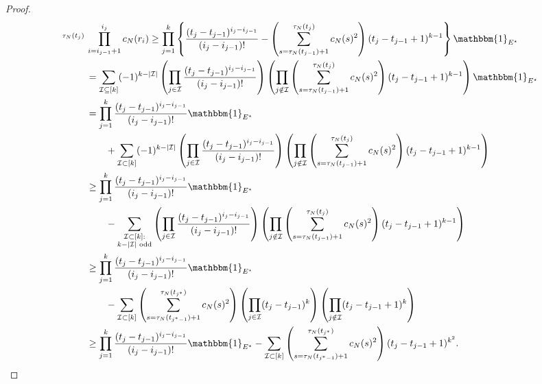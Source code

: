 \documentclass{article}
\newcommand{\1}[1]{\mathbbm{1}_{#1}}
\begin{document}
\begin{proof}
\begin{align}
        ^{\tau_N(t_j)}  \,&\prod_{i=i_{j-1}+1}^{i_j} c_N(r_i)
\geq \prod_{j=1}^k \left\{ \frac{(t_j - t_{j-1})^{i_j - i_{j-1}}}{(i_j - i_{j-1})!}  
        - \left( \sum_{s=\tau_N(t_{j-1})+1}^{\tau_N(t_j)} c_N(s)^2 \right)
        ( t_j - t_{j-1} +1 )^{k-1} \right\} \1{E^\star} \notag\\
&= \sum_{\mathcal{I} \subseteq [k]} (-1)^{k-|\mathcal{I}|} 
        \left( \prod_{j\in\mathcal{I}} \frac{(t_j - t_{j-1})^{i_j - i_{j-1}}}
        {(i_j - i_{j-1})!} \right)
        \left( \prod_{j\notin\mathcal{I}} \left( \sum_{s=\tau_N(t_{j-1})+1}
        ^{\tau_N(t_j)} c_N(s)^2 \right) ( t_j - t_{j-1} +1 )^{k-1} \right) 
        \1{E^\star} \notag\\
&= \prod_{j=1}^k \frac{(t_j - t_{j-1})^{i_j - i_{j-1}}}{(i_j - i_{j-1})!} 
        \1{E^\star} \notag\\
    &\qquad+ \sum_{\mathcal{I} \subset [k]} (-1)^{k-|\mathcal{I}|} 
        \left( \prod_{j\in\mathcal{I}} \frac{(t_j - t_{j-1})^{i_j - i_{j-1}}}
        {(i_j - i_{j-1})!} \right)
        \left( \prod_{j\notin\mathcal{I}} 
        \left( \sum_{s=\tau_N(t_{j-1})+1}^{\tau_N(t_j)} c_N(s)^2 \right) 
        ( t_j - t_{j-1} +1 )^{k-1} \right) \notag\\
&\geq \prod_{j=1}^k \frac{(t_j - t_{j-1})^{i_j - i_{j-1}}}{(i_j - i_{j-1})!} 
        \1{E^\star}  \notag\\
    &\qquad- \sum_{\substack{\mathcal{I} \subset [k]:\\k-|\mathcal{I}| 
        \text{ odd} }} \left( \prod_{j\in\mathcal{I}} 
        \frac{(t_j - t_{j-1})^{i_j - i_{j-1}}}{(i_j - i_{j-1})!} \right)
        \left( \prod_{j\notin\mathcal{I}} \left( \sum_{s=\tau_N(t_{j-1})+1}
        ^{\tau_N(t_j)} c_N(s)^2 \right) ( t_j - t_{j-1} +1 )^{k-1} \right) \notag\\
&\geq \prod_{j=1}^k \frac{(t_j - t_{j-1})^{i_j - i_{j-1}}}{(i_j - i_{j-1})!} 
        \1{E^\star} \notag\\
    &\qquad- \sum_{\mathcal{I} \subset [k]} 
        \left( \sum_{s=\tau_N(t_{j^*-1})+1}^{\tau_N(t_{j^*})} c_N(s)^2 \right)
        \left( \prod_{j\in\mathcal{I}} ( t_j - t_{j-1} )^k \right)
        \left( \prod_{j\notin\mathcal{I}} ( t_j - t_{j-1} +1 )^k \right) \notag\\
&\geq \prod_{j=1}^k \frac{(t_j - t_{j-1})^{i_j - i_{j-1}}}{(i_j - i_{j-1})!} 
        \1{E^\star}
        - \sum_{\mathcal{I} \subset [k]} 
        \left( \sum_{s=\tau_N(t_{j^*-1})+1}^{\tau_N(t_{j^*})} c_N(s)^2 \right)
        ( t_j - t_{j-1} +1 )^{k^2} .
\end{align}

\end{proof}
\end{document}
